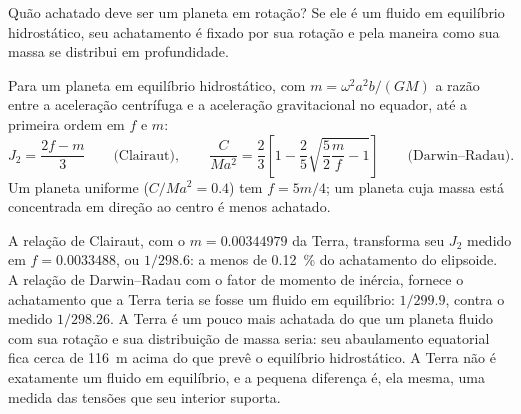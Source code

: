 Quão achatado deve ser um planeta em rotação? Se ele é um fluido em equilíbrio
hidrostático, seu achatamento é fixado por sua rotação e pela maneira como sua
massa se distribui em profundidade.

\begin{proposition}\label{prop:b3:gravity-geodesy:clairaut}
Para um planeta em equilíbrio hidrostático, com $m = \omega^2a^2b/(GM)$ a razão
entre a aceleração centrífuga e a aceleração gravitacional no equador, até a primeira
ordem em $f$ e $m$:
\[
  J_2 = \frac{2f - m}{3}\qquad\text{(Clairaut)},\qquad
  \frac{C}{Ma^2} = \frac23\left[1 - \frac25\sqrt{\frac52\frac mf - 1}\right]
  \qquad\text{(Darwin--Radau)} .
\]
Um planeta uniforme ($C/Ma^2 = 0.4$) tem $f = 5m/4$; um planeta cuja massa está
concentrada em direção ao centro é menos achatado.
\end{proposition}
\admitted

A relação de Clairaut, com o $m = \num{0.00344979}$ da Terra, transforma seu
$J_2$ medido em $f = \num{0.0033488}$, ou $1/298.6$: a menos de
\qty{0.12}{\percent} do achatamento do elipsoide. A relação de Darwin--Radau
com o fator de momento de inércia, fornece o achatamento que a Terra teria se
fosse um fluido em equilíbrio: $1/299.9$, contra o medido
$1/298.26$. A Terra é um pouco mais achatada do que um planeta fluido com sua rotação
e sua distribuição de massa seria: seu abaulamento equatorial fica cerca de
\qty{116}{m} acima do que prevê o equilíbrio hidrostático. A Terra não é
exatamente um fluido em equilíbrio, e a pequena diferença é, ela mesma,
uma medida das tensões que seu interior suporta.

